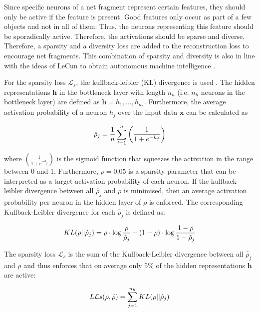 Since specific neurons of a net fragment represent certain features, they should only be active if the feature is present.
Good features only occur as part of a few objects and not in all of them: Thus, the neurons representing this feature should be sporadically active. Therefore, the activations should be sparse and diverse.
Therefore, a sparsity and a diversity loss are added to the reconstruction loss to encourage net fragments.
This combination of sparsity and diversity is also in line with the ideas of LeCun to obtain autonomous machine intelligence .


For the sparsity loss $\mathcal{L}_{s}$, the kullback-leibler (KL) divergence is used .
The hidden representations $\boldsymbol{h}$ in the bottleneck layer with length $n_h$ (i.e. $n_h$ neurons in the bottleneck layer) are defined as $\boldsymbol{h} = h_1, ..., h_{n_h}$.
Furthermore, the average activation probability of a neuron $h_j$ over the input data $\boldsymbol{x}$ can be calculated as

\begin{equation}\eqlbl{ae_kldd}
		\hat{\rho}_j = \frac{1}{n} \sum^n_{i=1} \left( \frac{1}{1+e^{-h_j}} \right)
\end{equation}

where $\left( \frac{1}{1+e^{-h_j}} \right)$ is the sigmoid function that squeezes the activation in the range between $0$ and $1$. Furthermore, $\rho=0.05$ is a sparsity parameter that can be interpreted as a target activation probability of each neuron. If the kullback-leibler divergence between all $\hat{\rho}_j$ and $\rho$ is minimised, then an average activation probability per neuron in the hidden layer of $\rho$ is enforced. The corresponding Kullback-Leibler divergence for each $\hat{\rho}_j$ is defined as:

\begin{equation}\eqlbl{ae_kld}
		KL(\rho || \hat{\rho}_j) = \rho \cdot \log \frac{\rho}{\hat{\rho}_j} + (1-\rho) \cdot \log \frac{1-\rho}{1-\hat{\rho}_j}
\end{equation}

The sparsity loss $\mathcal{L}_{s}$ is the sum of the Kullback-Leibler divergence between all $\hat{\rho}_j$ and $\rho$ and thus enforces that on average only $5\%$ of the hidden representations $\boldsymbol{h}$ are active:

\begin{equation}\eqlbl{ae_kldl}
		L\mathcal{L}{s}(\rho, \hat{\rho}) = \sum_{j=1}^{n_h} KL(\rho || \hat{\rho}_j)
\end{equation}


